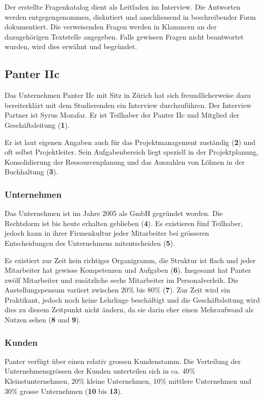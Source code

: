 Der erstellte Fragenkatalog dient als Leitfaden im Interview. Die Antworten
werden entgegengenommen, diskutiert und anschliessend in beschreibender Form
dokumentiert. Die verweisenden Fragen werden in Klammern an der dazugehörigen
Textstelle angegeben. Falls gewissen Fragen nicht beantwortet wurden, wird dies 
erwähnt und begründet.

\subsection{Panter IIc}
Das Unternehmen Panter IIc mit Sitz in Zürich hat sich freundlicherweise dazu
bereiterklärt mit dem Studierenden ein Interview durchzuführen. Der Interview
Partner ist Syrus Mozafar. Er ist Teilhaber der Panter IIc und Mitglied der
Geschäftsleitung (\textbf{1}).

Er ist laut eigenen Angaben auch für das Projektmanagement zuständig (\textbf{2})
und oft selbst Projektleiter. Sein Aufgabenbereich liegt speziell in der 
Projektplanung, Konsolidierung der Ressourcenplanung und das Auszahlen von
Löhnen in der Buchhaltung (\textbf{3}).

\subsubsection{Unternehmen}
Das Unternehmen ist im Jahre 2005 als GmbH gegründet worden. Die Rechtsform
ist bis heute erhalten geblieben (\textbf{4}). Es existieren fünf Teilhaber,
jedoch kann in ihrer Firmenkultur jeder Mitarbeiter bei grösseren Entscheidungen
des Unternehmens mitentscheiden (\textbf{5}).

Es existiert zur Zeit kein richtiges Organigramm, die Struktur ist flach
und jeder Mitarbeiter hat gewisse Kompetenzen und Aufgaben (\textbf{6}). 
Insgesamt hat Panter zwölf Mitarbeiter und zusätzliche sechs Mitarbeiter im
Personalverleih. Die Anstellungspensum variiert zwischen 20\% bis 80\% (\textbf{7}).
Zur Zeit wird ein Praktikant, jedoch noch keine Lehrlinge beschäftigt und die Geschäftsleitung
wird dies zu diesem Zeitpunkt nicht ändern, da sie darin eher einen Mehraufwand
als Nutzen sehen (\textbf{8} und \textbf{9}).

\subsubsection{Kunden}
Panter verfügt über einen relativ grossen Kundenstamm. Die Verteilung
der Unternehmensgrössen der Kunden unterteilen sich in ca. 40\% Kleinstunternehmen,
20\% kleine Unternehmen, 10\% mittlere Unternehmen und 30\% grosse
Unternehmen (\textbf{10} bis \textbf{13}).

